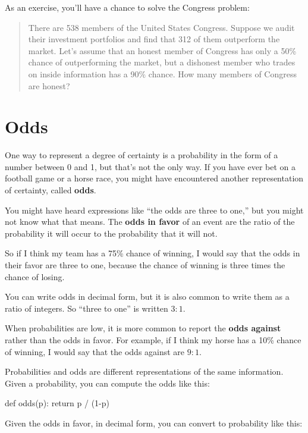 \documentclass[12pt]{book}
\theoremstyle{exercise}
\begin{document}
As an exercise, you'll have a chance to solve the Congress problem:

\begin{quote}
There are 538 members of the United States Congress.
Suppose we audit their investment portfolios and find that 312 of them outperform the market.
Let's assume that an honest member of Congress has only a 50\% chance of outperforming the market, but a dishonest member who trades on inside information has a 90\% chance.  How many members of Congress are honest?
\end{quote}


\section{Odds}

One way to represent a degree of certainty is a probability in the form of a number between 0 and 1, but that's not the only way.
If you have ever bet on a football game or a horse race, you might have encountered another representation of certainty, called {\bf odds}.


You might have heard expressions like ``the odds are
three to one,'' but you might not know what that means.
The {\bf odds in favor} of an event are the ratio of the probability
it will occur to the probability that it will not.

So if I think my team has a 75\% chance of winning, I would
say that the odds in their favor are three to one, because
the chance of winning is three times the chance of losing.

You can write odds in decimal form, but it is also common to
write them as a ratio of integers.  So ``three to one'' is
written $3:1$.

When probabilities are low, it is more common to report the
{\bf odds against} rather than the odds in favor.  For
example, if I think my horse has a 10\% chance of winning,
I would say that the odds against are $9:1$.

Probabilities and odds are different representations of the
same information.  Given a probability, you can compute the
odds like this:

\begin{code}
def odds(p):
    return p / (1-p)
\end{code}

Given the odds in favor, in decimal form, you can convert to probability like this:
\end{document}
